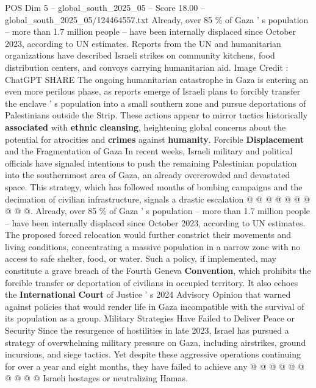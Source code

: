 \begin{textsample}{POS Dim 5 – global\_south\_2025\_05 – Score 18.00 – global\_south\_2025\_05/124464557.txt}  \label{ex:f5_pos_117}
Already, over 85 \% of Gaza ' s population -- more than 1.7 million people -- have been internally displaced since October 2023, according to UN estimates.
Reports from the UN and humanitarian organizations have described Israeli strikes on community kitchens, food distribution centers, and convoys carrying humanitarian aid.
Image Credit : ChatGPT SHARE The ongoing humanitarian catastrophe in Gaza is entering an even more perilous phase, as reports emerge of Israeli plans to forcibly transfer the enclave ' s population into a small southern zone and pursue deportations of Palestinians outside the Strip.
These actions appear to mirror tactics historically \textbf{associated} with \textbf{ethnic} \textbf{cleansing}, heightening global concerns about the potential for atrocities and \textbf{crimes} against \textbf{humanity}.
Forcible \textbf{Displacement} and the Fragmentation of Gaza In recent weeks, Israeli military and political officials have signaled intentions to push the remaining Palestinian population into the southernmost area of Gaza, an already overcrowded and devastated space.
This strategy, which has followed months of bombing campaigns and the decimation of civilian infrastructure, signals a drastic escalation @ @ @ @ @ @ @ @ @ @.
Already, over 85 \% of Gaza ' s population -- more than 1.7 million people -- have been internally displaced since October 2023, according to UN estimates.
The proposed forced relocation would further constrict their movements and living conditions, concentrating a massive population in a narrow zone with no access to safe shelter, food, or water.
Such a policy, if implemented, may constitute a grave breach of the Fourth Geneva \textbf{Convention}, which prohibits the forcible transfer or deportation of civilians in occupied territory.
It also echoes the \textbf{International} \textbf{Court} of Justice ' s 2024 Advisory Opinion that warned against policies that would render life in Gaza incompatible with the survival of its population as a group.
Military Strategies Have Failed to Deliver Peace or Security Since the resurgence of hostilities in late 2023, Israel has pursued a strategy of overwhelming military pressure on Gaza, including airstrikes, ground incursions, and siege tactics.
Yet despite these aggressive operations continuing for over a year and eight months, they have failed to achieve any @ @ @ @ @ @ @ @ @ @ Israeli hostages or neutralizing Hamas.

\end{textsample}
